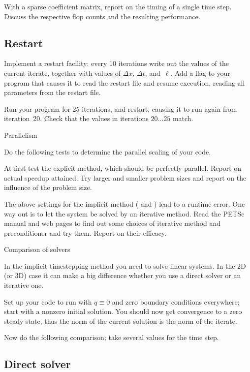 With a sparse coefficient matrix, report on the timing of a
  single time step. Discuss the respective flop counts and the
  resulting performance.


\subsection*{Restart}

Implement a restart facility: every 10 iterations write out the
values of the current iterate, together with values of $\Delta x$,
$\Delta t$, and~$\ell$. Add a flag  to your program that
causes it to read the restart file and resume execution, reading all
parameters from the restart file.

Run your program for 25 iterations, and restart, causing it to run
again from iteration~20. Check that the values in iterations
$20\ldots25$ match.

 {Parallelism}

Do the following tests to determine the parallel scaling of your code.

At first test the explicit method, which should be perfectly
  parallel. Report on actual speedup attained. Try larger and smaller
  problem sizes and report on the influence of the problem size.

The above settings for the implicit method ( and
) lead to a runtime error. One way out is to let the system be
solved by an iterative method. Read the PETSc manual and web pages to
find out some choices of iterative method and preconditioner and try
them. Report on their efficacy.

 {Comparison of solvers}

In the implicit timestepping method you need to solve linear
systems. In the 2D (or 3D) case it can make a big difference whether
you use a direct solver or an iterative one.

Set up your code to run with $q\equiv0$ and zero boundary
  conditions everywhere; start with a nonzero initial solution. You
  should now get convergence to a zero steady state, thus the norm of
  the current solution is the norm of the iterate. 

Now do the following comparison; take several values for the time
step.

\subsection*{Direct solver}


